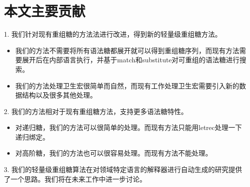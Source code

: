 \section{本文主要贡献}
\begin{flushleft}
	1.	我们针对现有重组糖的方法法进行改进，得到新的轻量级重组糖方法。
\end{flushleft}

\begin{itemize}
	\item 我们的方法不需要将所有语法糖都展开就可以得到重组糖序列，而现有方法需要展开后在内部语言执行，并基于match和substitute对可重组的语法糖进行搜索。
	\item 我们的方法处理卫生宏很简单而自然，而现有工作处理卫生宏需要引入新的数据结构以及很多其他处理。
\end{itemize}
\begin{flushleft}
	2.	我们的方法相对于现有重组糖方法，支持更多语法糖特性。
\end{flushleft}

\begin{itemize}
	\item 对递归糖，我们的方法可以很简单的处理。而现有方法只能用letrec处理一下递归绑定。
	\item 对高阶糖，我们的方法也可以很容易处理。而现有方法不能处理。
\end{itemize}
\begin{flushleft}
	3.	我们的轻量级重组糖算法在对领域特定语言的解释器进行自动生成的研究提供了一个思路。我们将在未来工作中进一步讨论。
\end{flushleft}



